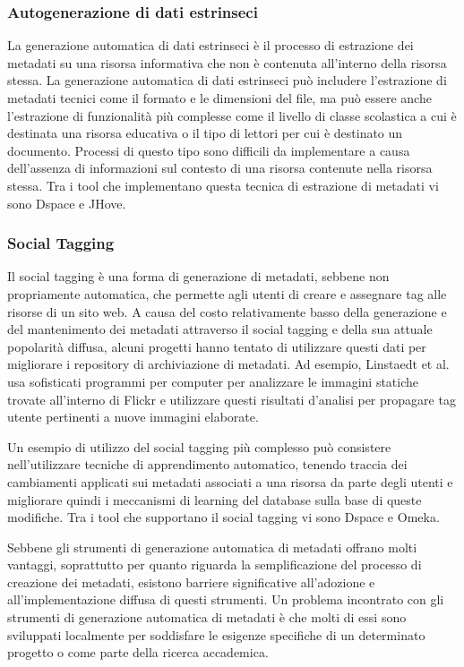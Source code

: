 \subsubsection{Autogenerazione di dati estrinseci}
La generazione automatica di dati estrinseci è il processo di estrazione dei metadati su una risorsa informativa che non è contenuta all'interno della risorsa stessa. La generazione automatica di dati estrinseci può includere l'estrazione di metadati tecnici come il formato e le dimensioni del file, ma può essere anche l'estrazione di funzionalità più complesse come il livello di classe scolastica a cui è destinata una risorsa educativa o il tipo di lettori per cui è destinato un documento.
Processi di questo tipo sono difficili da implementare a causa dell'assenza di informazioni sul contesto di una risorsa
contenute nella risorsa stessa.
Tra i tool che implementano questa tecnica di estrazione di metadati vi sono Dspace e JHove.

\subsubsection{Social Tagging}
Il social tagging è una forma di generazione di metadati, sebbene non propriamente automatica, che permette agli utenti di creare e assegnare tag alle risorse di un sito web. A causa del costo relativamente basso della generazione e del mantenimento dei metadati attraverso il social tagging e della sua attuale popolarità diffusa, alcuni progetti hanno tentato di utilizzare questi dati per migliorare i repository di archiviazione di metadati. Ad esempio, Linstaedt et al. usa sofisticati programmi per computer per analizzare le immagini statiche trovate all'interno di Flickr e utilizzare questi risultati d'analisi per propagare tag utente pertinenti a nuove immagini elaborate.

Un esempio di utilizzo del social tagging più complesso può consistere nell'utilizzare tecniche di apprendimento automatico, tenendo traccia dei cambiamenti applicati sui metadati associati a una risorsa da parte degli utenti e migliorare quindi i meccanismi di learning del database sulla base di queste modifiche.
Tra i tool che supportano il social tagging vi sono Dspace e Omeka.

Sebbene gli strumenti di generazione automatica di metadati offrano molti vantaggi, soprattutto per quanto riguarda la semplificazione del processo di creazione dei metadati, esistono barriere significative all'adozione e all'implementazione diffusa di questi strumenti. Un problema incontrato con gli strumenti di generazione automatica di metadati è che molti di essi sono sviluppati localmente per soddisfare le esigenze specifiche di un determinato progetto o come parte della ricerca accademica.

